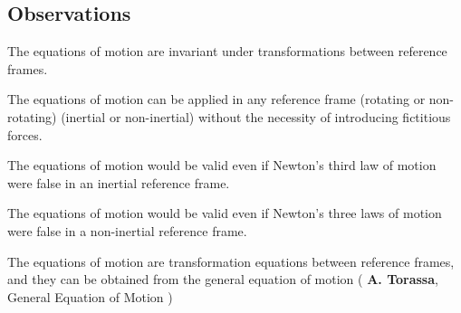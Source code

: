 \documentclass[10pt]{article}
\begin{document}
\vspace{+1.50em}

{\centering\subsection*{Observations}}

\vspace{+1.20em}

\par The equations of motion are invariant under transformations between reference frames.
\bigskip
\par The equations of motion can be applied in any reference frame (rotating or non-rotating) (inertial or non-inertial) without the necessity of introducing fictitious forces.
\bigskip
\par The equations of motion would be valid even if Newton's third law of motion were false in an inertial reference frame.
\bigskip
\par The equations of motion would be valid even if Newton's three laws of motion were false in a non-inertial reference frame.
\bigskip
\par The equations of motion are transformation equations between reference frames, and they can be obtained from the general equation of motion ( \hspace{-0.45em} \textbf{A. Torassa}, General Equation of Motion \hspace{-0.45em} )
\end{document}
